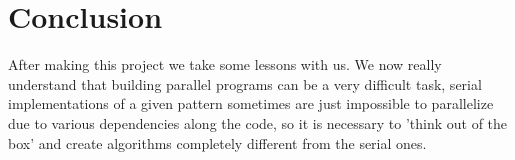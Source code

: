 \documentclass[conference,compsoc]{IEEEtran}
\begin{document}
\section{Conclusion} \label{Conclusion}
After making this project we take some lessons with us. We now really understand that building parallel programs can be a very difficult task, serial implementations of a given pattern sometimes are just impossible to parallelize due to various dependencies along the code, so it is necessary to 'think out of the box' and create algorithms completely different from the serial ones.









%
%
%
%



%
%


\end{document}
